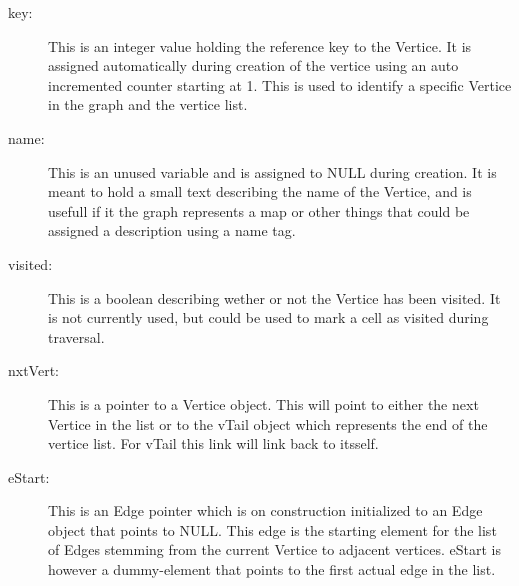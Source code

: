 \begin{description}
\item [key:]			This is an integer value holding the reference key to the
	Vertice. It is assigned automatically during creation of the vertice using an
	auto incremented counter starting at 1.  This is used to identify a specific
	Vertice in the graph and the vertice list.
\item [name:]			This is an unused variable and is assigned to NULL during
	creation. It is meant to hold a small text describing the name of the Vertice,
	and is usefull if it the graph represents a map or other things that could be
	assigned a description using a name tag.
\item [visited:]	This is a boolean describing wether or not the Vertice has
	been visited. It is not currently used, but could be used to mark a cell as
	visited during traversal.
\item [nxtVert:]	This is a pointer to a Vertice object. This will point to
	either the next Vertice in the list or to the vTail object which represents
	the end of the vertice list.  For vTail this link will link back to itsself.
\item [eStart:]		This is an Edge pointer which is on construction initialized
	to an Edge object that points to NULL.  This edge is the starting element for
	the list of Edges stemming from the current Vertice to adjacent vertices.
	eStart is however a dummy-element that points to the first actual edge in the
	list.
\end{description}

